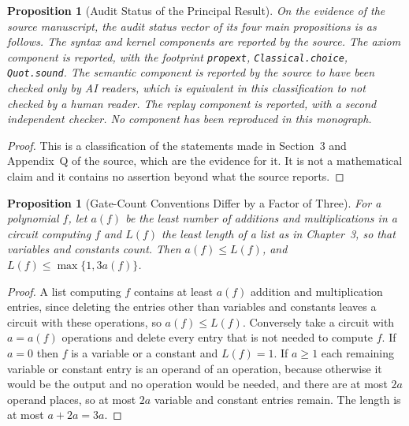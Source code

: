 \documentclass[11pt,letterpaper]{report}
\theoremstyle{plain}
\newtheorem{proposition}[theorem]{Proposition}
\theoremstyle{definition}
\theoremstyle{remark}
\begin{document}
\begin{proposition}[Audit Status of the Principal Result]\label{pr:auditstatus}
On the evidence of the source manuscript, the audit status vector of its four main propositions is as follows. The syntax and kernel components are reported by the source. The axiom component is reported, with the footprint \texttt{propext}, \texttt{Classical.choice}, \texttt{Quot.sound}. The semantic component is reported by the source to have been checked only by AI readers, which is equivalent in this classification to not checked by a human reader. The replay component is reported, with a second independent checker. No component has been reproduced in this monograph.
\end{proposition}
\begin{proof}
This is a classification of the statements made in Section~3 and Appendix~Q of the source, which are the evidence for it. It is not a mathematical claim and it contains no assertion beyond what the source reports.
\end{proof}

\begin{proposition}[Gate-Count Conventions Differ by a Factor of Three]\label{pr:gatecount}
For a polynomial $f$, let $a(f)$ be the least number of additions and multiplications in a circuit computing $f$ and $L(f)$ the least length of a list as in Chapter~3, so that variables and constants count. Then $a(f)\le L(f)$, and $L(f)\le\max\{1,3a(f)\}$.
\end{proposition}
\begin{proof}
A list computing $f$ contains at least $a(f)$ addition and multiplication entries, since deleting the entries other than variables and constants leaves a circuit with these operations, so $a(f)\le L(f)$. Conversely take a circuit with $a=a(f)$ operations and delete every entry that is not needed to compute $f$. If $a=0$ then $f$ is a variable or a constant and $L(f)=1$. If $a\ge1$ each remaining variable or constant entry is an operand of an operation, because otherwise it would be the output and no operation would be needed, and there are at most $2a$ operand places, so at most $2a$ variable and constant entries remain. The length is at most $a+2a=3a$.
\end{proof}
\end{document}
